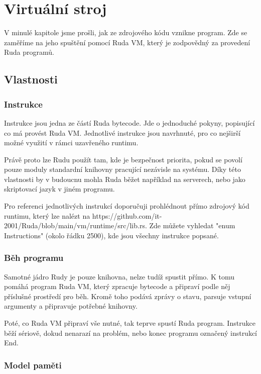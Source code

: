 \documentclass[12pt, a4paper,
twoside,        %
openright
]{report}
\let\oldchapter\chapter
\renewcommand{\chapter}{
	\clearpage
	\pagestyle{fancy}
	\oldchapter
}
\begin{document}
\chapter{Virtuální stroj}

V minulé kapitole jsme prošli, jak ze zdrojového kódu vznikne program. Zde se zaměříme na jeho spuštění pomocí Ruda VM, který je zodpovědný za provedení Ruda programů.

\section{Vlastnosti}

\subsection{Instrukce}

Instrukce jsou jedna ze částí Ruda bytecode. Jde o jednoduché pokyny, popisující co má provést Ruda VM. Jednotlivé instrukce jsou navrhnuté, pro co nejširší možné využití v rámci uzavřeného runtimu. 

Právě proto lze Rudu použít tam, kde je bezpečnost priorita, pokud se povolí pouze moduly standardní knihovny pracující nezávisle na systému. Díky této vlastnosti by v budoucnu mohla Ruda běžet například na serverech, nebo jako skriptovací jazyk v jiném programu.

Pro referenci jednotlivých instrukcí doporučuji prohlédnout přímo zdrojový kód runtimu, který lze nalézt na https://github.com/it-2001/Ruda/blob/main/vm/runtime/src/lib.rs. Zde můžete vyhledat "enum Instructions" (okolo řádku 2500), kde jsou všechny instrukce popsané.

\subsection{Běh programu}

Samotné jádro Rudy je pouze knihovna, nelze tudíž spustit přímo. K tomu pomáhá program Ruda VM, který zpracuje bytecode a připraví podle něj příslušné prostředí pro běh. Kromě toho podává zprávy o stavu, parsuje vstupní argumenty a připravuje potřebné knihovny.

Poté, co Ruda VM připraví vše nutné, tak teprve spustí Ruda program. Instrukce běží sériově, dokud nenarazí na problém, nebo konec programu označený instrukcí End.

\subsection{Model paměti}
\end{document}
